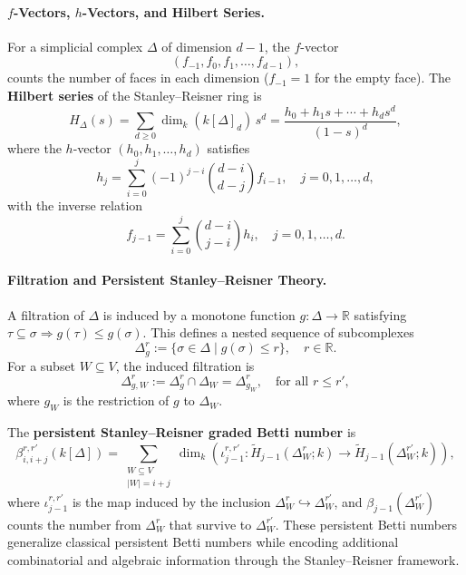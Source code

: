 \documentclass[10pt,twocolumn]{article}
\begin{document}
\paragraph{$f$-Vectors, $h$-Vectors, and Hilbert Series.}
For a simplicial complex $\Delta$ of dimension $d-1$, the $f$-vector
\begin{equation}
(f_{-1}, f_0, f_1, \ldots, f_{d-1}),
\label{eq:fvec}
\end{equation}
counts the number of faces in each dimension ($f_{-1} = 1$ for the empty face).
The \textbf{Hilbert series} of the Stanley--Reisner ring is
\begin{equation}
H_\Delta(s) = \sum_{d \geq 0} \dim_k(k[\Delta]_d)\, s^d
            = \frac{h_0 + h_1 s + \cdots + h_d s^d}{(1-s)^d},
\label{eq:hilbert}
\end{equation}
where the $h$-vector $(h_0, h_1, \ldots, h_d)$ satisfies
\begin{equation}
h_j = \sum_{i=0}^{j} (-1)^{j-i} \binom{d-i}{d-j} f_{i-1},
\quad j = 0, 1, \ldots, d,
\label{eq:h_from_f}
\end{equation}
with the inverse relation
\begin{equation}
f_{j-1} = \sum_{i=0}^{j} \binom{d-i}{j-i} h_i,
\quad j = 0, 1, \ldots, d.
\label{eq:f_from_h}
\end{equation}

\paragraph{Filtration and Persistent Stanley--Reisner Theory.}
A filtration of $\Delta$ is induced by a monotone function
$g: \Delta \to \mathbb{R}$ satisfying $\tau \subseteq \sigma \Rightarrow g(\tau) \leq g(\sigma)$.
This defines a nested sequence of subcomplexes
\begin{equation}
\Delta_g^r := \{\sigma \in \Delta \mid g(\sigma) \leq r\}, \quad r \in \mathbb{R}.
\label{eq:filtration}
\end{equation}
For a subset $W \subseteq V$, the induced filtration is
\begin{equation}
\Delta_{g,W}^r := \Delta_g^r \cap \Delta_W = \Delta_{g_W}^r,
\quad \text{for all } r \leq r',
\label{eq:induced_filt}
\end{equation}
where $g_W$ is the restriction of $g$ to $\Delta_W$.

The \textbf{persistent Stanley--Reisner graded Betti number} is
\begin{equation}
\beta_{i,i+j}^{r,r'}(k[\Delta]) =
\sum_{\substack{W \subseteq V \\ |W| = i+j}} \dim_k\!\left(
  \iota_{j-1}^{r,r'}: \tilde{H}_{j-1}(\Delta_W^r; k)
  \to \tilde{H}_{j-1}(\Delta_W^{r'}; k)
\right),
\label{eq:persistent_betti}
\end{equation}
where $\iota_{j-1}^{r,r'}$ is the map induced by the inclusion $\Delta_W^r \hookrightarrow \Delta_W^{r'}$,
and $\beta_{j-1}(\Delta_W^{r'})$ counts the number from $\Delta_W^r$ that survive to $\Delta_W^{r'}$.
These persistent Betti numbers generalize classical persistent Betti numbers while
encoding additional combinatorial and algebraic information through the Stanley--Reisner
framework.
\end{document}
